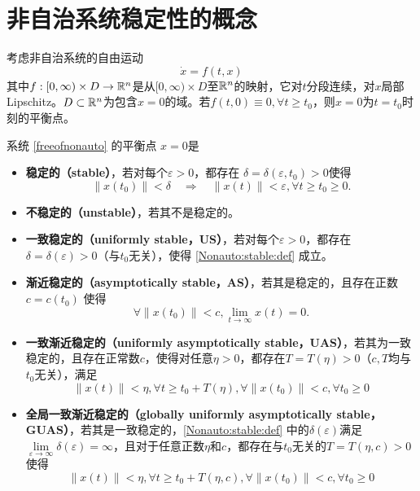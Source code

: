 \section{非自治系统稳定性的概念}\label{3Bref}
考虑非自治系统的自由运动
\begin{equation}\label{freeofnonauto}
  \dot{x}=f(t,x)
\end{equation}
其中$f : [0, \infty) \times D \rightarrow \mathbb{R}{}^n$是从$[0, \infty) \times D$至$\mathbb{R}{}^n$的映射，它对$t$分段连续，对$x$局部Lipschitz。$D\subset\mathbb{R}{}^n$为包含$x=0$的域。若$f(t,0)\equiv0,\forall t\ge t_0$，则$x=0$为$t=t_0$时刻的平衡点。
\begin{definition}[非自治系统的稳定性]
 系统 \eqref{freeofnonauto} 的平衡点 $x = 0$是
  \begin{itemize}[leftmargin=1em]
    \item {\bf 稳定的（stable）}，若对每个$\varepsilon > 0$，都存在 $\delta =    \delta (\varepsilon, t_0)>0$使得
    \begin{equation}
      \| x (t_0) \| < \delta \quad \Rightarrow \quad \| x (t) \| <
      \varepsilon, \forall t \geq t_0 \geq 0 \label{Nonauto:stable:def} .
    \end{equation}
    \item {\bf 不稳定的（unstable）}，若其不是稳定的。
    
    \item {\bf 一致稳定的（uniformly stable，US）}，若对每个$\varepsilon > 0$，都存在
    $\delta = \delta (\varepsilon) > 0$（与$t_0$无关），使得 \eqref{Nonauto:stable:def} 成立。
    
    \item {\bf 渐近稳定的（asymptotically stable，AS）}，若其是稳定的，且存在正数
     $c = c (t_0)$ 使得
    \begin{equation}
      \forall \| x (t_0) \| < c, \lim_{t \rightarrow \infty} x (t) = 0 \label{Nonauto:astable:def} .
    \end{equation}
    \item {\bf 一致渐近稳定的（uniformly asymptotically stable，UAS）}，若其为一致稳定的，且存在正常数$c$，使得对任意$\eta>0$，都存在$T=T(\eta)>0$（$c,T$均与$t_0$无关），满足
    \[\|x(t)\|<\eta,\forall t\ge t_0+T(\eta),\forall\|x(t_0)\|<c,\forall t_0\ge0\]
    
    \item {\bf 全局一致渐近稳定的（globally uniformly asymptotically stable，GUAS）}，若其是一致稳定的，\eqref{Nonauto:stable:def} 中的$\delta(\varepsilon)$满足$\lim\limits_{\varepsilon\to\infty}\delta(\varepsilon)=\infty$，且对于任意正数$\eta$和$c$，都存在与$t_0$无关的$T=T(\eta,c)>0$使得
    \[\|x(t)\|<\eta,\forall t\ge t_0+T(\eta,c),\forall\|x(t_0)\|<c,\forall t_0\ge0\]
  \end{itemize}
\end{definition}
